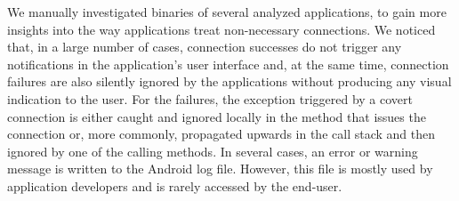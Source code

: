We manually investigated binaries of several analyzed applications, to gain more insights into the way applications treat non-necessary connections. %
We noticed that, in a large number of cases, connection successes do not trigger any notifications in the application's user interface and, at the same time, connection failures are also silently ignored by the applications without producing any visual indication to the user. 
For the failures, the exception triggered by a covert connection is either caught and ignored locally in the method that issues the connection or, more commonly, propagated upwards in the call stack and then ignored by one of the calling methods. In several cases, an error or warning message is written to the Android log file. However, this file is mostly used by  application developers and is rarely accessed by the end-user.












